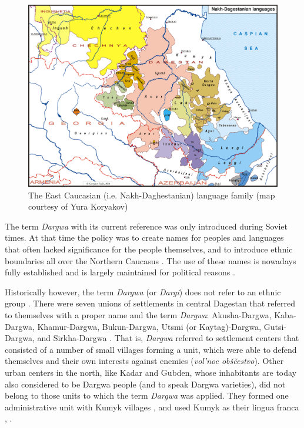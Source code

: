 \begin{figure}[t!]
	\caption{The East Caucasian (i.e. Nakh-Daghestanian) language family (map courtesy of Yura Koryakov)}
	\label{fig:Map 3}
	\includegraphics[scale=0.6, angle =90]{figures/NEC_color_2016.png}
\end{figure}

The term \textit{Dargwa} with its current reference was only introduced during Soviet times. At that time the policy was to create names for peoples and languages that often lacked significance for the people themselves, and to introduce ethnic boundaries all over the Northern Caucasus \citep[114]{Grenoble2003}. The use of these names is nowadays fully established and is largely maintained for political reasons \citep{Shaxbanov2009}.

Historically however, the term \textit{Dargwa} (or \textit{Dargi}) does not refer to an ethnic group \citep[13]{Abdullaev1954}. There were seven unions of settlements in central Dagestan that referred to themselves with a proper name and the term \textit{Dargwa}: Akusha-Dargwa, Kaba-Dargwa, Khamur-Dargwa, Bukun-Dargwa, Utsmi (or Kaytag)-Dargwa, Gutsi-Dargwa, and Sirkha-Dargwa \citep[13]{Magomedov1999}. That is, \textit{Dargwa} referred to settlement centers that consisted of a number of small villages forming a unit, which were able to defend themselves and their own interests against enemies (\textit{vol'noe obščestvo}). Other urban centers in the north, like Kadar and Gubden, whose inhabitants are today also considered to be Dargwa people (and to speak Dargwa varieties), did not belong to those units to which the term \textit{Dargwa} was applied. They formed one administrative unit with Kumyk villages \citep[12]{Abdullaev1954}, and used Kumyk as their lingua franca \citep{DobrushinaDanielKoryakov}, \citep[58]{Wixman1980}. 

